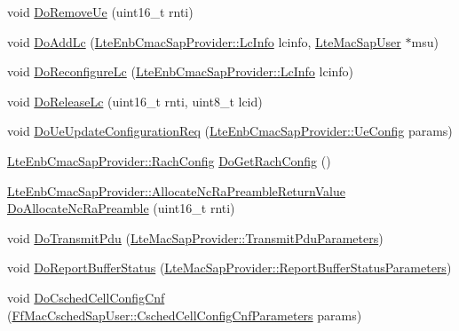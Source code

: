\begin{DoxyCompactItemize}
\item 
void \hyperlink{classns3_1_1LteEnbMac_ace3d9716f5a9bade6a217bd5210a165b}{Do\+Remove\+Ue} (uint16\+\_\+t rnti)
\item 
void \hyperlink{classns3_1_1LteEnbMac_aafa6a2a0f3507fb9849b642b7964969b}{Do\+Add\+Lc} (\hyperlink{structns3_1_1LteEnbCmacSapProvider_1_1LcInfo}{Lte\+Enb\+Cmac\+Sap\+Provider\+::\+Lc\+Info} lcinfo, \hyperlink{classns3_1_1LteMacSapUser}{Lte\+Mac\+Sap\+User} $\ast$msu)
\item 
void \hyperlink{classns3_1_1LteEnbMac_a91f7ed64e3021e1cb04e0205f526bd16}{Do\+Reconfigure\+Lc} (\hyperlink{structns3_1_1LteEnbCmacSapProvider_1_1LcInfo}{Lte\+Enb\+Cmac\+Sap\+Provider\+::\+Lc\+Info} lcinfo)
\item 
void \hyperlink{classns3_1_1LteEnbMac_a582322599d859d3ba9ac4b51252dccf7}{Do\+Release\+Lc} (uint16\+\_\+t rnti, uint8\+\_\+t lcid)
\item 
void \hyperlink{classns3_1_1LteEnbMac_a8d93bd41ab576a027eb1c2358b3a9280}{Do\+Ue\+Update\+Configuration\+Req} (\hyperlink{structns3_1_1LteEnbCmacSapProvider_1_1UeConfig}{Lte\+Enb\+Cmac\+Sap\+Provider\+::\+Ue\+Config} params)
\item 
\hyperlink{structns3_1_1LteEnbCmacSapProvider_1_1RachConfig}{Lte\+Enb\+Cmac\+Sap\+Provider\+::\+Rach\+Config} \hyperlink{classns3_1_1LteEnbMac_a9faf0a11d8187271038b3fd034195930}{Do\+Get\+Rach\+Config} ()
\item 
\hyperlink{structns3_1_1LteEnbCmacSapProvider_1_1AllocateNcRaPreambleReturnValue}{Lte\+Enb\+Cmac\+Sap\+Provider\+::\+Allocate\+Nc\+Ra\+Preamble\+Return\+Value} \hyperlink{classns3_1_1LteEnbMac_ac4fcd278ef3da6ee6d070f9d990428db}{Do\+Allocate\+Nc\+Ra\+Preamble} (uint16\+\_\+t rnti)
\item 
void \hyperlink{classns3_1_1LteEnbMac_a13637a1fdfb2341a427bbbce2370a28e}{Do\+Transmit\+Pdu} (\hyperlink{structns3_1_1LteMacSapProvider_1_1TransmitPduParameters}{Lte\+Mac\+Sap\+Provider\+::\+Transmit\+Pdu\+Parameters})
\item 
void \hyperlink{classns3_1_1LteEnbMac_a30388c5ecd2097812f6141584b034a8a}{Do\+Report\+Buffer\+Status} (\hyperlink{structns3_1_1LteMacSapProvider_1_1ReportBufferStatusParameters}{Lte\+Mac\+Sap\+Provider\+::\+Report\+Buffer\+Status\+Parameters})
\item 
void \hyperlink{classns3_1_1LteEnbMac_a0d04c612177aa792f3b843ebae93bf04}{Do\+Csched\+Cell\+Config\+Cnf} (\hyperlink{structns3_1_1FfMacCschedSapUser_1_1CschedCellConfigCnfParameters}{Ff\+Mac\+Csched\+Sap\+User\+::\+Csched\+Cell\+Config\+Cnf\+Parameters} params)

\end{DoxyCompactItemize}
